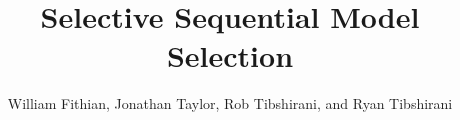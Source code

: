 \documentclass{article}
\begin{document}
\newtheorem{theorem}{Theorem}
\newtheorem{corollary}[theorem]{Corollary}
\newtheorem{lemma}[theorem]{Lemma}
\newtheorem{observation}[theorem]{Observation}
\newtheorem{proposition}[theorem]{Proposition}
\newtheorem{definition}[theorem]{Definition}
\newtheorem{claim}[theorem]{Claim}
\newtheorem{fact}[theorem]{Fact}
\newtheorem{assumption}[theorem]{Assumption}
\newtheorem{model}[theorem]{Model}

\theoremstyle{definition}
\newtheorem{example}{Example}

\newcommand{\cM}{\mathcal{M}}
\newcommand{\cH}{\mathcal{H}}
\newcommand{\cD}{\mathcal{D}}
\newcommand{\FDR}{\textnormal{FDR}}
\newcommand{\FCR}{\textnormal{FCR}}
\newcommand{\crt}{\phi}
\newcommand{\M}{\mathcal{M}}
\newcommand{\cY}{\mathcal{Y}}
\newcommand{\cX}{\mathcal{X}}
\newcommand{\cV}{\mathcal{V}}
\newcommand{\bX}{\mathbf{X}}
\newcommand{\x}{\mathbf{x}}
\newcommand{\Gv}{\;\;\big|\;\;}
\newcommand{\proj}{\cP}
\newcommand{\pow}{\text{Pow}}
\newcommand{\sF}{\mathscr{F}}
\newcommand{\cF}{\mathcal{F}}
\newcommand{\sC}{\mathscr{C}}
\newcommand{\hJ}{\widehat{J}}
\newcommand{\bH}{\mathbf{H}}
\newcommand{\bM}{\mathbf{M}}
\newcommand{\tM}{\widetilde{M}}
\newcommand{\tE}{\widetilde{E}}
\newcommand{\tV}{\widetilde{V}}
\newcommand{\tR}{\widetilde{R}}
\newcommand{\tL}{\widetilde{L}}
\newcommand{\hk}{\hat{k}}
\newcommand{\hr}{\hat{r}}       
\newcommand{\cN}{\mathcal{N}}
\newcommand{\cJ}{\mathcal{J}}
\newcommand{\leqAS}{\overset{\textrm{a.s.}}{\leq}}
\newcommand{\Err}{\mathcal{E}}
\newcommand{\RSS}{\text{RSS}}


\newcommand*\mystrut{\vrule width0pt height0pt depth1.5ex\relax}
\newcommand{\underlabel}{\underbracket[1pt][.5pt]{\mystrut \quad\;\; \sub \quad\;\; }}
\newcommand{\JTcomment}[1]{{\color{blue}{(JT: \bf \sc #1) }}}
\newcommand{\WFcomment}[1]{{\color{red}{(WF: \bf \sc #1) }}}
\newcommand{\RTcomment}[1]{{\color{green}{(RT: \bf \sc #1) }}}

\title{Selective Sequential Model Selection}
\author{William Fithian, Jonathan Taylor, Rob Tibshirani, and Ryan Tibshirani}
\maketitle
\end{document}
